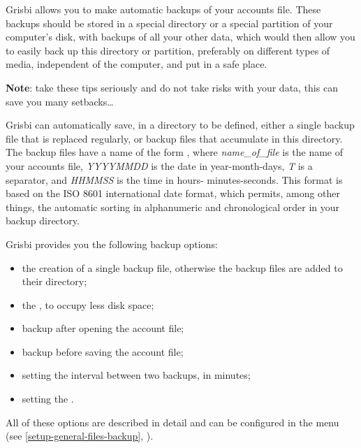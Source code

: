 Grisbi allows you to make automatic backups of your accounts file. These backups should be stored in a special directory or a special \gls{partition} of your computer's disk, with backups of all your other data, which would then allow you to easily back up this directory or partition, preferably on different types of media, independent of the computer, and put in a safe place.

\textbf{Note}:  take these tips seriously and do not take risks with your data, this can save you many setbacks\ldots

Grisbi can automatically save, in a directory to be defined, either a single backup file that is replaced regularly, or backup files that accumulate in this directory.
The backup files have a name of the form , where \emph{name\_of\_file} is the name of your accounts file, \emph{YYYYMMDD} is the date in year-month-days, \emph{T}  is a separator, and \emph{HHMMSS}  is the time in hours- minutes-seconds. This format is based on the ISO 8601 international date format, which permits, among other things, the automatic sorting in alphanumeric and chronological order in your backup directory.

Grisbi provides you the following backup options:

\begin{itemize}
	\item the creation of a single backup file, otherwise the backup files are added to their directory;
	\item the , to occupy less disk space;
	\item backup after opening the account file; 
	\item backup before saving the account file; 
	\item setting the interval between two backups, in minutes;
	\item setting the .
\end{itemize}

All of these options are described in detail and can be configured in the  menu (see \vref{setup-general-files-backup}, ).


